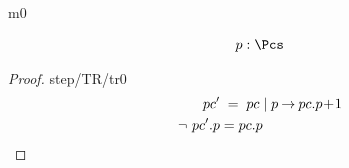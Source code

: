 \documentclass[12pt]{amsart}
\begin{document}
\begin{machine}{m0}

\begin{align*}
\indices{step}{	p: \Pcs}
\end{align*}


\begin{proof}{step/TR/tr0}
\begin{align}
	\assume{hyp1}{ pc' &\1= pc \1| p \tfun pc.p\0+1 } \\
	\goal{\neg ~ pc'.p  &= pc.p}
\end{align}
	\easy
\end{proof}

\end{machine}
\end{document}
